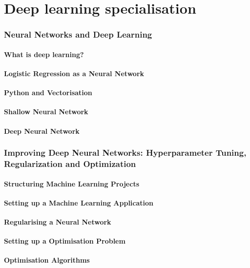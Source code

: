 \part{Deep learning specialisation}

\section{Neural Networks and Deep Learning}
\subsection{What is deep learning?}
\subsection{Logistic Regression as a Neural Network}
\subsection{Python and Vectorisation}
\subsection{Shallow Neural Network}
\subsection{Deep Neural Network}

\section{Improving Deep Neural Networks: Hyperparameter Tuning, Regularization and Optimization}
\subsection{Structuring Machine Learning Projects}
\subsection{Setting up a Machine Learning Application}
\subsection{Regularising a Neural Network}
\subsection{Setting up a Optimisation Problem}
\subsection{Optimisation Algorithms}
